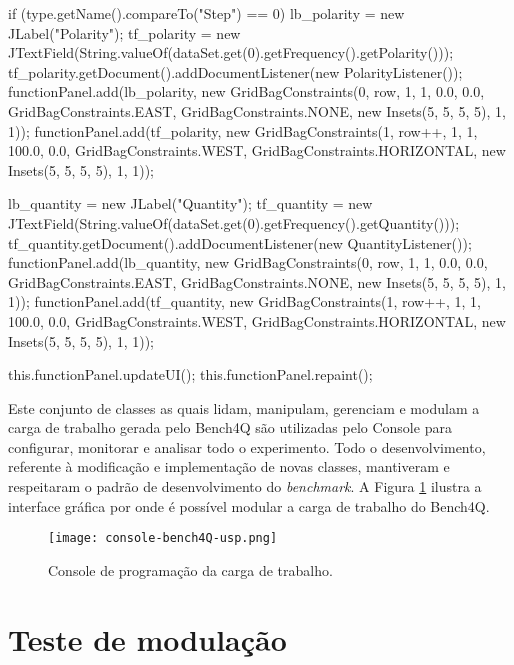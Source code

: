 \begin{codigo}[caption={Código para gerar a os parâmetros para a modulação}, label={code:panel}, breaklines=true]
{		if (type.getName().compareTo("Step") == 0) {
			lb_polarity = new JLabel("Polarity");
			tf_polarity = new JTextField(String.valueOf(dataSet.get(0).getFrequency().getPolarity()));
			tf_polarity.getDocument().addDocumentListener(new PolarityListener());
			functionPanel.add(lb_polarity, new GridBagConstraints(0, row, 1, 1, 0.0, 0.0, GridBagConstraints.EAST,
			GridBagConstraints.NONE, new Insets(5, 5, 5, 5), 1, 1));
			functionPanel.add(tf_polarity, new GridBagConstraints(1, row++, 1, 1, 100.0, 0.0, GridBagConstraints.WEST,
			GridBagConstraints.HORIZONTAL, new Insets(5, 5, 5, 5), 1, 1));
		}
		
		lb_quantity = new JLabel("Quantity");
		tf_quantity = new JTextField(String.valueOf(dataSet.get(0).getFrequency().getQuantity()));
		tf_quantity.getDocument().addDocumentListener(new QuantityListener());
		functionPanel.add(lb_quantity, new GridBagConstraints(0, row, 1, 1, 0.0, 0.0, GridBagConstraints.EAST,
		GridBagConstraints.NONE, new Insets(5, 5, 5, 5), 1, 1));
		functionPanel.add(tf_quantity, new GridBagConstraints(1, row++, 1, 1, 100.0, 0.0, GridBagConstraints.WEST,
		GridBagConstraints.HORIZONTAL, new Insets(5, 5, 5, 5), 1, 1));
		
		this.functionPanel.updateUI();
		this.functionPanel.repaint();
		
	}
\end{codigo}

Este conjunto de classes as quais lidam, manipulam, gerenciam e modulam a carga de trabalho gerada pelo Bench4Q são utilizadas pelo Console para configurar, monitorar e analisar todo o experimento. Todo o desenvolvimento, referente à modificação e implementação de novas classes, mantiveram e respeitaram o padrão de desenvolvimento do \textit{benchmark}. A Figura \ref{fig:interface-criada-beanch4q} ilustra a interface gráfica por onde é possível modular a carga de trabalho do Bench4Q. 

\begin{figure}[!htb]
	\centering
	\texttt{[image: console-bench4Q-usp.png]}
	\caption{Console de programação da carga de trabalho.}
	\label{fig:interface-criada-beanch4q}
	\fautor
\end{figure}


\section{Teste de modulação}

